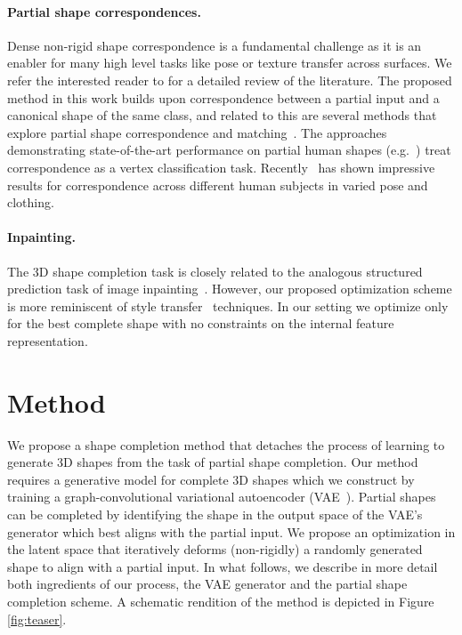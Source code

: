 \documentclass[10pt,twocolumn,letterpaper]{article}
\begin{document}
\paragraph{Partial shape correspondences.}
Dense non-rigid shape correspondence \cite{kim11,chen15,fmnet,rodola14,bronstein2006generalized} is a fundamental challenge as it is an enabler for many high level tasks like pose or texture transfer across surfaces. We refer the interested reader to \cite{van2011survey,biasotti2015recent} for a detailed review of the literature. The proposed method in this work builds upon correspondence between a partial input and a canonical shape of the same class, and related to this are several methods that explore partial shape correspondence and matching~\cite{rodola16-partial,monet,litany17fully}. The approaches demonstrating state-of-the-art performance on partial human shapes (e.g.~\cite{monet}) treat correspondence as a vertex classification task. Recently~\cite{wei2016dense} has shown impressive results for correspondence across different human subjects in varied pose and clothing. 

\paragraph{Inpainting.}
The 3D shape completion task is closely related to the analogous structured prediction task of image inpainting~\cite{pathakCVPR16context,Yang_2017_CVPR}. However, our proposed optimization scheme is more reminiscent of style transfer~\cite{gatysStyleTransfer} techniques. In our setting we optimize only for the best complete shape with no constraints on the internal feature representation.
\section{Method}\label{sec:method}
We propose a shape completion method that detaches the process of learning to generate 3D shapes from the task of partial shape completion. Our method requires a generative model for complete 3D shapes which we construct by training a graph-convolutional variational autoencoder (VAE~\cite{kingma2014iclr}). Partial shapes can be completed by identifying the shape in the output space of the VAE's generator which best aligns with the partial input. We propose an optimization in the latent space that iteratively deforms (non-rigidly) a randomly generated shape to align with a partial input. In what follows, we describe in more detail both ingredients of our process, the VAE generator and the partial shape completion scheme. A schematic rendition of the method is depicted in Figure \ref{fig:teaser}.
\end{document}
